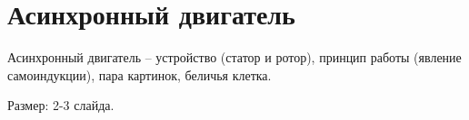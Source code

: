 \section{Асинхронный двигатель}

Асинхронный двигатель -- устройство (статор и ротор), принцип работы (явление самоиндукции), пара картинок, беличья клетка.

Размер: 2-3 слайда.
